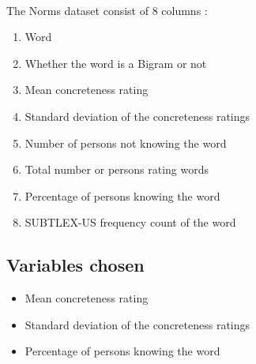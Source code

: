 \documentclass[11pt,a4paper]{article}
\begin{document}
\paragraph{}
The Norms dataset consist of 8 columns :
\begin{enumerate}
	\item Word
	\item Whether the word is a Bigram or not
	\item Mean concreteness rating
	\item Standard deviation of the concreteness ratings
	\item Number of persons not knowing the word
	\item Total number or persons rating words
	\item Percentage of persons knowing the word
	\item SUBTLEX-US frequency count of the word
\end{enumerate}

\subsection{Variables chosen}

\begin{itemize}
	\item Mean concreteness rating
	\item Standard deviation of the concreteness ratings
	\item Percentage of persons knowing the word
\end{itemize}







\end{document}
